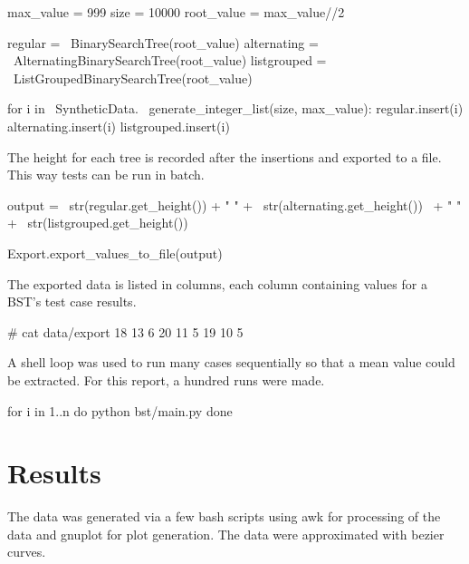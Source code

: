 \documentclass[fleqn,10pt]{SelfArx} %
\begin{document}
\begin{captioned_code}[title=Test Case for 0.1\% Collision Rate]
    max_value = 999
    size = 10000
    root_value = max_value//2
    
    regular = \
    BinarySearchTree(root_value)
    alternating = \
    AlternatingBinarySearchTree(root_value)
    listgrouped = \
    ListGroupedBinarySearchTree(root_value)

    for i in \
    	SyntheticData. \
    	generate_integer_list(size,
    		max_value):
        regular.insert(i)
        alternating.insert(i)
        listgrouped.insert(i)
\end{captioned_code}

The height for each tree is recorded after the insertions and exported to a file. This way tests can be run in batch.
\begin{captioned_code}[]
    output = \
    str(regular.get_height()) + " " + \
    str(alternating.get_height()) \
    + " " + \
    str(listgrouped.get_height())
    
    Export.export_values_to_file(output)
\end{captioned_code}

The exported data is listed in columns, each column containing values for a BST's test case results.
\begin{captioned_code}[]
# cat data/export
18 13 6
20 11 5
19 10 5

\end{captioned_code}
A shell loop was used to run many cases sequentially so that a mean value could be extracted. For this report, a hundred runs were made.
\begin{captioned_code}[]
for i in {1..n}
	do python bst/main.py
done 
\end{captioned_code}

\section{Results}
	The data was generated via a few bash scripts using awk for processing of the data and gnuplot for plot generation. The data were approximated with bezier curves.
\end{document}
